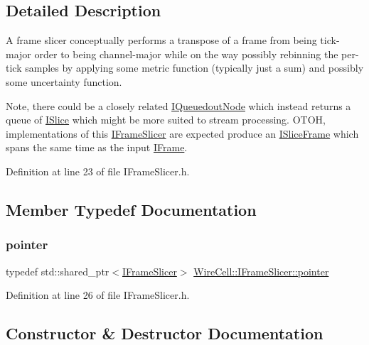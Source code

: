 \subsection{Detailed Description}
A frame slicer conceptually performs a transpose of a frame from being tick-\/major order to being channel-\/major while on the way possibly rebinning the per-\/tick samples by applying some metric function (typically just a sum) and possibly some uncertainty function.

Note, there could be a closely related \hyperlink{class_wire_cell_1_1_i_queuedout_node}{I\+Queuedout\+Node} which instead returns a queue of \hyperlink{class_wire_cell_1_1_i_slice}{I\+Slice} which might be more suited to stream processing. O\+T\+OH, implementations of this \hyperlink{class_wire_cell_1_1_i_frame_slicer}{I\+Frame\+Slicer} are expected produce an \hyperlink{class_wire_cell_1_1_i_slice_frame}{I\+Slice\+Frame} which spans the same time as the input \hyperlink{class_wire_cell_1_1_i_frame}{I\+Frame}. 

Definition at line 23 of file I\+Frame\+Slicer.\+h.



\subsection{Member Typedef Documentation}
\mbox{\label{class_wire_cell_1_1_i_frame_slicer_a8ecaccfa6013e07f0d4f7b0438ef7ee8}} 
\subsubsection{\texorpdfstring{pointer}{pointer}}
{\footnotesize\ttfamily typedef std\+::shared\+\_\+ptr$<$\hyperlink{class_wire_cell_1_1_i_frame_slicer}{I\+Frame\+Slicer}$>$ \hyperlink{class_wire_cell_1_1_i_frame_slicer_a8ecaccfa6013e07f0d4f7b0438ef7ee8}{Wire\+Cell\+::\+I\+Frame\+Slicer\+::pointer}}



Definition at line 26 of file I\+Frame\+Slicer.\+h.



\subsection{Constructor \& Destructor Documentation}
\mbox{\label{class_wire_cell_1_1_i_frame_slicer_a32dc41fc3b3da509688d2fe0ef88335f}} 
